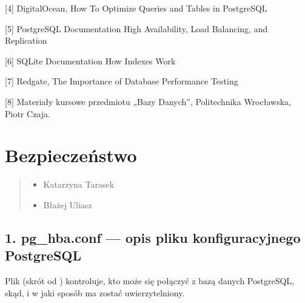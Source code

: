\documentclass[letterpaper,10pt,polish]{sphinxmanual}
\begin{document}
\sphinxAtStartPar
{[}4{]} DigitalOcean, How To Optimize Queries and Tables in PostgreSQL

\sphinxAtStartPar
{[}5{]} PostgreSQL Documentation \textendash{} High Availability, Load Balancing, and Replication

\sphinxAtStartPar
{[}6{]} SQLite Documentation \textendash{} How Indexes Work

\sphinxAtStartPar
{[}7{]} Redgate, The Importance of Database Performance Testing

\sphinxAtStartPar
{[}8{]} Materiały kursowe przedmiotu „Bazy Danych”, Politechnika Wrocławska, Piotr Czaja.

\sphinxstepscope


\section{Bezpieczeństwo}
\label{\detokenize{rozdzial2/bezpieczenstwo/index:bezpieczenstwo}}\label{\detokenize{rozdzial2/bezpieczenstwo/index::doc}}\begin{quote}\begin{description}
\begin{itemize}
\item {} 
\sphinxAtStartPar
Katarzyna Tarasek

\item {} 
\sphinxAtStartPar
Błażej Uliasz

\end{itemize}

\end{description}\end{quote}


\subsection{1. pg\_hba.conf — opis pliku konfiguracyjnego PostgreSQL}
\label{\detokenize{rozdzial2/bezpieczenstwo/index:pg-hba-conf-opis-pliku-konfiguracyjnego-postgresql}}
\sphinxAtStartPar
Plik  (skrót od ) kontroluje, kto może się połączyć z bazą danych PostgreSQL, skąd, i w jaki sposób ma zostać uwierzytelniony.
\end{document}
